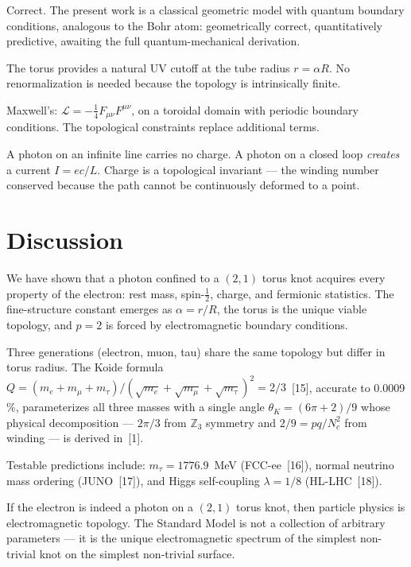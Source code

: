\documentclass[10pt,twoside,a5paper]{article}
\begin{document}
Correct. The present work is a classical geometric model with quantum boundary conditions, analogous to the Bohr atom: geometrically correct, quantitatively predictive, awaiting the full quantum-mechanical derivation.

The torus provides a natural UV cutoff at the tube radius $r = \alpha R$. No renormalization is needed because the topology is intrinsically finite.

Maxwell's: $\mathcal{L} = -\frac{1}{4}F_{\mu\nu}F^{\mu\nu}$, on a toroidal domain with periodic boundary conditions. The topological constraints replace additional terms.

A photon on an infinite line carries no charge. A photon on a closed loop \emph{creates} a current $I = ec/L$. Charge is a topological invariant --- the winding number conserved because the path cannot be continuously deformed to a point.


\section{Discussion}

We have shown that a photon confined to a $(2,1)$ torus knot acquires every property of the electron: rest mass, spin-$\frac{1}{2}$, charge, and fermionic statistics. The fine-structure constant emerges as $\alpha = r/R$, the torus is the unique viable topology, and $p = 2$ is forced by electromagnetic boundary conditions.

Three generations (electron, muon, tau) share the same topology but differ in torus radius. The Koide formula $Q = (m_e + m_\mu + m_\tau)/(\sqrt{m_e} + \sqrt{m_\mu} + \sqrt{m_\tau})^2 = 2/3$~[15], accurate to 0.0009\,\%, parameterizes all three masses with a single angle $\theta_K = (6\pi+2)/9$ whose physical decomposition --- $2\pi/3$ from $\mathbb{Z}_3$ symmetry and $2/9 = pq/N_c^2$ from winding --- is derived in~[1].

Testable predictions include: $m_\tau = 1776.9$~MeV (FCC-ee~[16]), normal neutrino mass ordering (JUNO~[17]), and Higgs self-coupling $\lambda = 1/8$ (HL-LHC~[18]).

If the electron is indeed a photon on a $(2,1)$ torus knot, then particle physics is electromagnetic topology. The Standard Model is not a collection of arbitrary parameters --- it is the unique electromagnetic spectrum of the simplest non-trivial knot on the simplest non-trivial surface.
\end{document}
